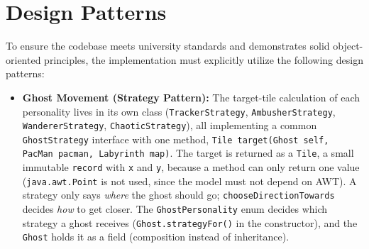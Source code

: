 \documentclass[11pt, a4paper]{article}
\begin{document}
\clearpage

\section{Design Patterns}
\label{sec:design_patterns}
To ensure the codebase meets university standards and demonstrates solid object-oriented principles, the implementation must explicitly utilize the following design patterns:

\begin{itemize}
    \item \textbf{Ghost Movement (Strategy Pattern):} The target-tile calculation of each personality lives in its own class (\texttt{TrackerStrategy}, \texttt{AmbusherStrategy}, \texttt{WandererStrategy}, \texttt{ChaoticStrategy}), all implementing a common \texttt{GhostStrategy} interface with one method, \texttt{Tile target(Ghost self, PacMan pacman, Labyrinth map)}. The target is returned as a \texttt{Tile}, a small immutable \texttt{record} with \texttt{x} and \texttt{y}, because a method can only return one value (\texttt{java.awt.Point} is not used, since the model must not depend on AWT). A strategy only says \textit{where} the ghost should go; \texttt{chooseDirectionTowards} decides \textit{how} to get closer. The \texttt{GhostPersonality} enum decides which strategy a ghost receives (\texttt{Ghost.strategyFor()} in the constructor), and the \texttt{Ghost} holds it as a field (composition instead of inheritance).


\end{itemize}
\end{document}
